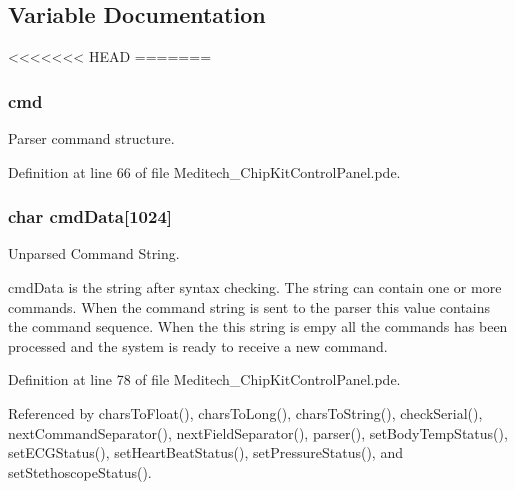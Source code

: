 \begin{DoxyCode}
\begin{DoxyCode}
\begin{DoxyCode}
\begin{DoxyCode}
\subsection{Variable Documentation}
<<<<<<< HEAD
=======
\hypertarget{_meditech___chip_kit_control_panel_8pde_a9ec7ba7a86dba057afdae246ca1ac40e}{
\subsubsection[{cmd}]{ cmd}}\label{_meditech___chip_kit_control_panel_8pde_a9ec7ba7a86dba057afdae246ca1ac40e}


Parser command structure. 



Definition at line 66 of file Meditech\-\_\-\-Chip\-Kit\-Control\-Panel.\-pde.

\hypertarget{_meditech___chip_kit_control_panel_8pde_afd31a444e0380e6be247c64cdb1510a9}{
\subsubsection[{cmd\-Data}]{\setlength{\rightskip}{0pt plus 5cm}char cmd\-Data\mbox{[}1024\mbox{]}\hspace{0.3cm}{\ttfamily [static]}}}\label{_meditech___chip_kit_control_panel_8pde_afd31a444e0380e6be247c64cdb1510a9}


Unparsed Command String. 

cmd\-Data is the string after syntax checking. The string can contain one or more commands. When the command string is sent to the parser this value contains the command sequence. When the this string is empy all the commands has been processed and the system is ready to receive a new command. 

Definition at line 78 of file Meditech\-\_\-\-Chip\-Kit\-Control\-Panel.\-pde.



Referenced by chars\-To\-Float(), chars\-To\-Long(), chars\-To\-String(), check\-Serial(), next\-Command\-Separator(), next\-Field\-Separator(), parser(), set\-Body\-Temp\-Status(), set\-E\-C\-G\-Status(), set\-Heart\-Beat\-Status(), set\-Pressure\-Status(), and set\-Stethoscope\-Status().


\end{DoxyCode}
\end{DoxyCode}
\end{DoxyCode}
\end{DoxyCode}
